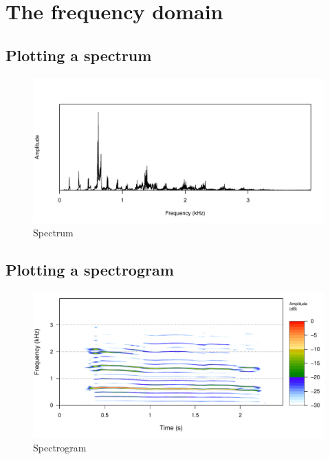 \documentclass[
]{book}
\begin{document}
\hypertarget{the-frequency-domain}{%
\section{The frequency domain}\label{the-frequency-domain}}

\hypertarget{plotting-a-spectrum}{%
\subsection{Plotting a spectrum}\label{plotting-a-spectrum}}

\begin{figure}

{\centering \includegraphics[width=0.9\linewidth]{_main_files/figure-latex/spectrum-1} 

}

\caption{Spectrum}\label{fig:spectrum}
\end{figure}

\hypertarget{plotting-a-spectrogram}{%
\subsection{Plotting a spectrogram}\label{plotting-a-spectrogram}}

\begin{figure}

{\centering \includegraphics[width=0.9\linewidth]{_main_files/figure-latex/spectrogram-1} 

}

\caption{Spectrogram}\label{fig:spectrogram}
\end{figure}
\end{document}
